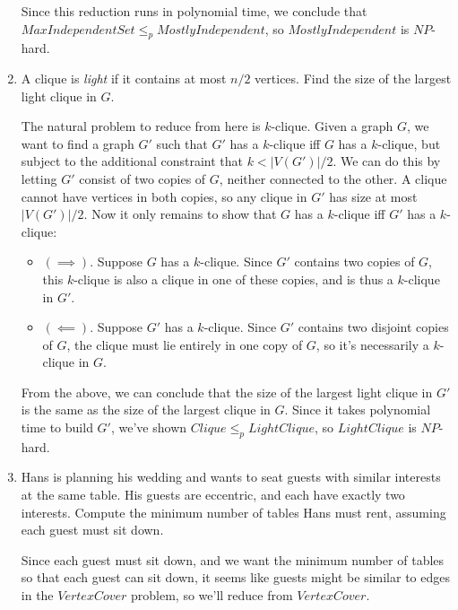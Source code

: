 \documentclass[fleqn]{article}
\begin{document}
\begin{enumerate}
\begin{answer}
        Since this reduction runs in polynomial time, we conclude that $MaxIndependentSet \leq_p MostlyIndependent$, so $MostlyIndependent$ is $NP$-hard.
    \end{answer}
    \item A clique is \textit{light} if it contains at most $n/2$ vertices. Find the size of the largest light clique in $G$.
    \begin{answer}
        The natural problem to reduce from here is $k$-clique. Given a graph $G$, we want to find a graph $G'$ such that $G'$ has a $k$-clique iff $G$ has a $k$-clique, but subject to the additional constraint that $k < |V(G')|/2$. We can do this by letting $G'$ consist of two copies of $G$, neither connected to the other. A clique cannot have vertices in both copies, so any clique in $G'$ has size at most $|V(G')|/2$. Now it only remains to show that $G$ has a $k$-clique iff $G'$ has a $k$-clique:
        \begin{itemize}
            \item $(\implies)$. Suppose $G$ has a $k$-clique. Since $G'$ contains two copies of $G$, this $k$-clique is also a clique in one of these copies, and is thus a $k$-clique in $G'$.
            \item $(\impliedby)$. Suppose $G'$ has a $k$-clique. Since $G'$ contains two disjoint copies of $G$, the clique must lie entirely in one copy of $G$, so it's necessarily a $k$-clique in $G$.
        \end{itemize}
        From the above, we can conclude that the size of the largest light clique in $G'$ is the same as the size of the largest clique in $G$. Since it takes polynomial time to build $G'$, we've shown $Clique \leq_p LightClique$, so $LightClique$ is $NP$-hard.
    \end{answer}
    \item Hans is planning his wedding and wants to seat guests with similar interests at the same table. His guests are eccentric, and each have exactly two interests. Compute the minimum number of tables Hans must rent, assuming each guest must sit down.
    \begin{answer}
        Since each guest must sit down, and we want the minimum number of tables so that each guest can sit down, it seems like guests might be similar to edges in the $VertexCover$ problem, so we'll reduce from $VertexCover$.

\end{answer}
\end{enumerate}
\end{document}
